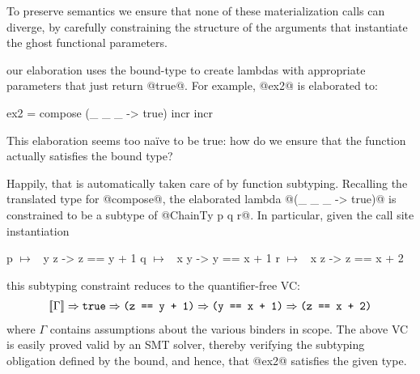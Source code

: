 To preserve semantics we ensure that none of these materialization
calls can diverge, by carefully constraining the structure of
the arguments that instantiate the ghost functional parameters.

 our elaboration uses
the bound-type to create lambdas with appropriate parameters
that just return @true@. For example, @ex2@ is elaborated to:
%
\begin{code}
  ex2 = compose (\_ _ _ -> true) incr incr
\end{code}
%
This elaboration seems too na\"ive to be true: how do we
ensure that the function actually satisfies the bound type?

Happily, that is automatically taken care of by function subtyping.
%
Recalling the translated type for @compose@, the elaborated lambda
@(\_ _ _ ->  true)@ is constrained to be a subtype of @ChainTy p q r@.
%
In particular, given the call site instantiation
%
\begin{mcode}
  p $\mapsto$ \ y z -> z == y + 1
  q $\mapsto$ \ x y -> y == x + 1
  r $\mapsto$ \ x z -> z == x + 2
\end{mcode}
%
this subtyping constraint reduces to the quantifier-free VC:
%
\begin{align*}
\inter{\Gamma}
  \Rightarrow \mathtt{true}
  \Rightarrow \cc{(z == y + 1)}
   \Rightarrow \cc{(y == x + 1)}\notag
   \Rightarrow \cc{(z == x + 2)} %
\end{align*}
%
%
where $\Gamma$ contains assumptions about the various binders in
scope.
%
The above VC is easily proved valid by an SMT solver, thereby
verifying the subtyping obligation defined by the bound, and hence,
that @ex2@ satisfies the given type.
